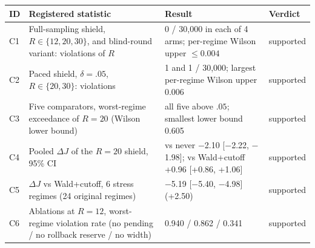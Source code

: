 \begin{tabular}{@{}l p{3.9cm} p{5.7cm} l@{}}
\toprule
ID & Registered statistic & Result & Verdict \\
\midrule
C1 & Full-sampling shield, $R\in\{12,20,30\}$, and blind-round variant: violations of $R$ & 0 / 30{,}000 in each of 4 arms; per-regime Wilson upper $\le 0.004$ & supported \\
C2 & Paced shield, $\delta=.05$, $R\in\{20,30\}$: violations & 1 and 1 / 30{,}000; largest per-regime Wilson upper 0.006 & supported \\
C3 & Five comparators, worst-regime exceedance of $R=20$ (Wilson lower bound) & all five above $.05$; smallest lower bound 0.605 & supported \\
C4 & Pooled $\Delta J$ of the $R=20$ shield, 95\% CI & vs never $-$2.10 [$-$2.22, $-$1.98]; vs Wald+cutoff +0.96 [+0.86, +1.06] & supported \\
C5 & $\Delta J$ vs Wald+cutoff, 6 stress regimes (24 original regimes) & $-$5.19 [$-$5.40, $-$4.98] (+2.50) & supported \\
C6 & Ablations at $R=12$, worst-regime violation rate (no pending / no rollback reserve / no width) & 0.940 / 0.862 / 0.341 & supported \\
\bottomrule
\end{tabular}
